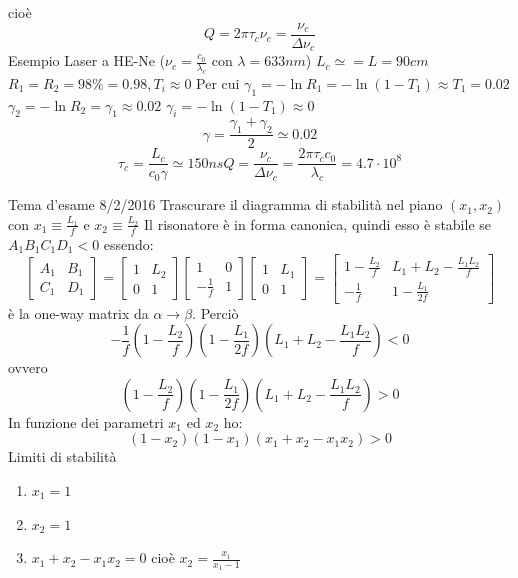 \documentclass{book}
\def \D {\Delta}
\def \l {\lambda}
\theoremstyle{remark}
\begin{document}
cioè 
\begin{equation*}
Q = 2\pi \tau_c \nu_c = \frac{\nu_c}{\Delta \nu_c}
\end{equation*}
Esempio
Laser a HE-Ne ($\nu_c = \frac{c_0}{\l_c}$ con $\l = 633 nm$) $L_c \simeq = L = 90cm$ $R_1 = R_2 = 98\% = 0.98, T_i \approx 0$ Per cui
$\gamma_1 = -\ln R_1 = -\ln (1-T_1) \approx T_1 = 0.02$ $\gamma_2 = -\ln R_2 = \gamma_1 \approx 0.02$ $\gamma_i = -\ln (1-T_1) \approx 0$
\begin{equation}
\gamma = \frac{\gamma_1 + \gamma_2}{2} \simeq 0.02
\end{equation}
\begin{equation*}
\tau_c = \frac{L_c}{c_0\gamma} \simeq 150 ns
Q = \frac{\nu_c}{\D \nu_c} = \frac{2\pi \tau_c c_0}{\l_c} = 4.7 \cdot 10^8
\end{equation*}

Tema d'esame 8/2/2016
Trascurare il diagramma di stabilità nel piano $(x_1, x_2)$ con $x_1 \equiv \frac{L_1}{f}$ e $x_2 \equiv \frac{L_2}{f}$
Il risonatore è in forma canonica, quindi esso è stabile se $A_1B_1C_1D_1 < 0$ essendo:
\begin{equation*}
\begin{bmatrix}
A_1	&	B_1\\
C_1	&	D_1
\end{bmatrix}
=\begin{bmatrix}
1	&	L_2\\
0	&	1
\end{bmatrix}\begin{bmatrix}
1	&	0\\
-\frac{1}{f}	&	1
\end{bmatrix}\begin{bmatrix}
1	&	L_1\\
0	&	1
\end{bmatrix}=\begin{bmatrix}
1-\frac{L_2}{f}	&	L_1+L_2-\frac{L_1L_2}{f}\\
-\frac{1}{f}	&	1-\frac{L_1}{2f}
\end{bmatrix}
\end{equation*}
è la one-way matrix da $\alpha \rightarrow \beta$. Perciò
\begin{equation*}
-\frac{1}{f} (1-\frac{L_2}{f})(1-\frac{L_1}{2f})(L_1+L_2-\frac{L_1L_2}{f}) < 0
\end{equation*}
ovvero
\begin{equation*}
(1-\frac{L_2}{f})(1-\frac{L_1}{2f})(L_1+L_2-\frac{L_1L_2}{f}) > 0
\end{equation*}
In funzione dei parametri $x_1$ ed $x_2$ ho:
\begin{equation*}
(1-x_2)(1-x_1)(x_1+x_2-x_1x_2) > 0
\end{equation*}
Limiti di stabilità
\begin{enumerate}
\item $x_1 = 1$
\item $x_2 = 1$
\item $x_1 + x_2 - x_1x_2 = 0$ cioè $x_2 = \frac{x_1}{x_1 - 1}$
\end{enumerate}
\end{document}
